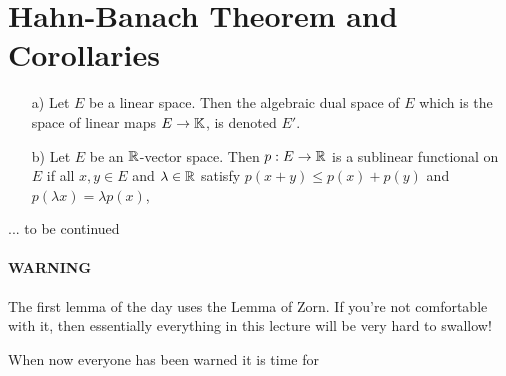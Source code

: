 \section{Hahn-Banach Theorem and Corollaries}
\begin{definition}
\begin{enumerate}
	\item[a)] Let $E$ be a linear space. Then the algebraic dual space of $E$ which is the space of linear maps $E \rightarrow \mathbb{K}$, is denoted $E'$.
	\item[b)] Let $E$ be an $\mathbb{R}$-vector space. Then $p: E \rightarrow \mathbb{R}$ is a sublinear functional on $E$ if all $x,y \in E$ and $\lambda \in \mathbb{R}$ satisfy
	$p(x+y) \le p(x) + p(y)$ and $p(\lambda x) = \lambda p(x)$,
\end{enumerate}
\end{definition}

\begin{lemma}
... to be continued
\end{lemma}

\paragraph*{WARNING} The first lemma of the day uses the Lemma of Zorn. If you're not comfortable with it, then essentially everything in this lecture will be very hard to swallow!

When now everyone has been warned it is time for

